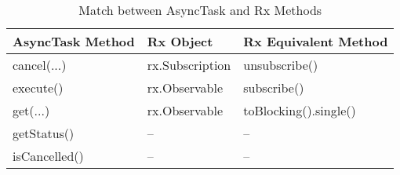 \begin{table}[H]
\begin{center}
\begin{tabular}{|C{4cm}|C{4cm}|C{4cm}|}
\hline
\bf AsyncTask Method & \bf Rx Object & \bf Rx Equivalent Method\\\hline
cancel(...) & rx.Subscription & unsubscribe()\\
execute() & rx.Observable & subscribe()\\
get(...) & rx.Observable & toBlocking().single()\\
getStatus() & -- & --\\
isCancelled() & -- & --\\\hline
\end{tabular}
\end{center}
\caption{Match between AsyncTask and Rx Methods}
\label{table:asynctask-rx-methods}
\end{table}